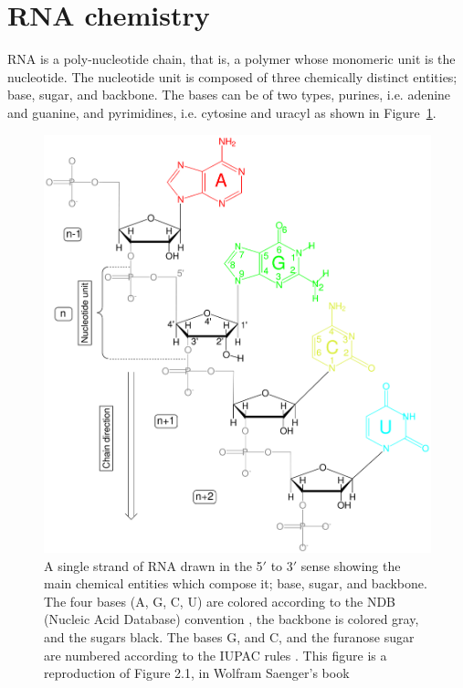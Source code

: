\section{RNA chemistry}
RNA is  a poly-nucleotide  chain, that is,  a polymer  whose monomeric
unit  is the  nucleotide.  The  nucleotide unit  is composed  of three
chemically distinct entities; base, sugar, and backbone. The bases can
be of two  types, purines, i.e. adenine and  guanine, and pyrimidines,
i.e. cytosine and uracyl as shown in Figure~\ref{fig:chemistry1}.
\begin{figure}
\centering
\includegraphics[scale=3.2]{Chapter1/chemistry1b.png}
\caption{A  single strand  of  RNA drawn  in  the 5$'$  to 3$'$  sense
  showing the  main chemical entities  which compose it;  base, sugar,
  and backbone.  The four bases (A,  G, C, U) are colored according to
  the  NDB  (Nucleic  Acid  Database)  convention  \cite{ndburl},  the
  backbone is colored gray, and the  sugars black. The bases G, and C,
  and the  furanose sugar  are numbered according  to the  IUPAC rules
  \cite{iupac1983}. This  figure is a  reproduction of Figure  2.1, in
  Wolfram Saenger's book \cite{saenger1984}}
\label{fig:chemistry1}
\end{figure}  

